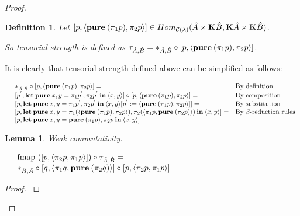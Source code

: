 \documentclass[a4paper]{article}
\newtheorem{lemma}{Lemma}
\newtheorem{defin}{Definition}
\begin{document}
\begin{proof}
\begin{defin}
  Let $[p, \langle {\bf pure \:} (\pi_1 p), \pi_2 p \rangle] \in Hom_{\mathcal{C}(\lambda)}(\hat{A} \times {\bf K}\hat{B}, {\bf K}\hat{A} \times {\bf K}\hat{B})$.

  So tensorial strength is defined as $\tau_{\hat{A}, \hat{B}} = \ast_{\hat{A}, \hat{B}} \circ [p, \langle {\bf pure \:} (\pi_1 p), \pi_2 p \rangle]$.
\end{defin}

It is clearly that tensorial strength defined above can be simplified as follows:

$\begin{array}{lll}
&\ast_{\hat{A}, \hat{B}} \circ [p, \langle {\bf pure \:} (\pi_1 p), \pi_2 p \rangle] = & \text{By definition} \\
&[p^{'}, {\bf let \: pure \:} x, y = \pi_1 p^{'}, \pi_2 p^{'} {\: \bf in \:} \langle x, y \rangle] \circ [p, \langle {\bf pure \:} (\pi_1 p), \pi_2 p \rangle] = & \text{By composition} \\
&[p, {\bf let \: pure \:} x, y = \pi_1 p^{'}, \pi_2 p^{'} {\: \bf in \:} \langle x, y \rangle [p^{'} := \langle {\bf pure \:} (\pi_1 p), \pi_2 p \rangle]] = & \text{By substitution} \\
&[p, {\bf let \: pure \:} x, y = \pi_1 (\langle {\bf pure \:} (\pi_1 p), \pi_2 p \rangle), \pi_2 (\langle \pi_1 p, {\bf pure \:} (\pi_2 p) \rangle) {\: \bf in \:} \langle x, y \rangle] = & \text{By $\beta$-reduction rules} \\
&[p, {\bf let \: pure \:} x, y = {\bf pure \:} (\pi_1 p), \pi_2 p {\: \bf in \:} \langle x, y \rangle]&
\end{array}$



\begin{lemma} Weak commutativity.
  $ $

  $\begin{array}{lll}
  & \text{fmap } ([p, \langle \pi_2 p, \pi_1 p \rangle]) \circ \tau_{\hat{A},\hat{B}} = & \\
  & \ast_{\hat{B}, \hat{A}} \circ [q, \langle \pi_1 q, {\bf pure \:} (\pi_2 q) \rangle] \circ [p, \langle \pi_2 p, \pi_1 p \rangle]&
  \end{array}$
\end{lemma}

\begin{proof}
  $ $


\end{proof}
\end{proof}
\end{document}
